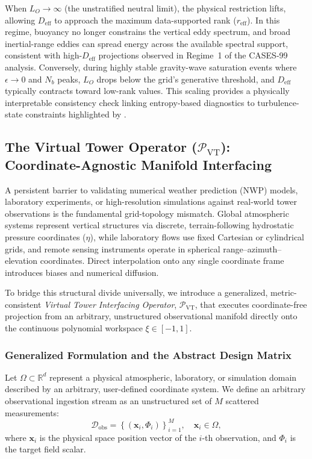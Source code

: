When $L_O \rightarrow \infty$ (the unstratified neutral limit), the physical restriction lifts, allowing $D_{\mathrm{eff}}$ to approach the maximum data-supported rank ($r_{\mathrm{eff}}$). In this regime, buoyancy no longer constrains the vertical eddy spectrum, and broad inertial-range eddies can spread energy across the available spectral support, consistent with high-$D_{\mathrm{eff}}$ projections observed in Regime~1 of the CASES-99 analysis. Conversely, during highly stable gravity-wave saturation events where $\epsilon \rightarrow 0$ and $N_b$ peaks, $L_O$ drops below the grid's generative threshold, and $D_{\mathrm{eff}}$ typically contracts toward low-rank values. This scaling provides a physically interpretable consistency check linking entropy-based diagnostics to turbulence-state constraints highlighted by \citet{Garanaik2019}.

\subsection{The Virtual Tower Operator (\texorpdfstring{$\mathcal{P}_{\mathrm{VT}}$}{PVT}): Coordinate-Agnostic Manifold Interfacing}
\label{sec:extensions:virtual_tower}

A persistent barrier to validating numerical weather prediction (NWP) models, laboratory experiments, or high-resolution simulations against real-world tower observations is the fundamental grid-topology mismatch. Global atmospheric systems represent vertical structures via discrete, terrain-following hydrostatic pressure coordinates ($\eta$), while laboratory flows use fixed Cartesian or cylindrical grids, and remote sensing instruments operate in spherical range--azimuth--elevation coordinates. Direct interpolation onto any single coordinate frame introduces biases and numerical diffusion.

To bridge this structural divide universally, we introduce a generalized, metric-consistent \emph{Virtual Tower Interfacing Operator}, $\mathcal{P}_{\mathrm{VT}}$, that executes coordinate-free projection from an arbitrary, unstructured observational manifold directly onto the continuous polynomial workspace $\xi \in [-1, 1]$.

\subsubsection{Generalized Formulation and the Abstract Design Matrix}
\label{sec:extensions:p_vt_math}

Let $\Omega \subset \mathbb{R}^d$ represent a physical atmospheric, laboratory, or simulation domain described by an arbitrary, user-defined coordinate system. We define an arbitrary observational ingestion stream as an unstructured set of $M$ scattered measurements:
\begin{equation}
\mathcal{D}_{\mathrm{obs}} = \left\{ \left(\mathbf{x}_i, \Phi_i\right) \right\}_{i=1}^M, \quad \mathbf{x}_i \in \Omega,
\label{eq:scattered_data_set}
\end{equation}
where $\mathbf{x}_i$ is the physical space position vector of the $i$-th observation, and $\Phi_i$ is the target field scalar.

